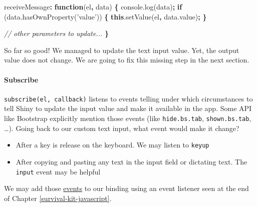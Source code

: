 \documentclass[]{book}
\newenvironment{Shaded}{\begin{snugshade}}{\end{snugshade}}
\newcommand{\AttributeTok}[1]{\textcolor[rgb]{0.77,0.63,0.00}{#1}}
\newcommand{\CommentTok}[1]{\textcolor[rgb]{0.56,0.35,0.01}{\textit{#1}}}
\newcommand{\ControlFlowTok}[1]{\textcolor[rgb]{0.13,0.29,0.53}{\textbf{#1}}}
\newcommand{\KeywordTok}[1]{\textcolor[rgb]{0.13,0.29,0.53}{\textbf{#1}}}
\newcommand{\NormalTok}[1]{#1}
\newcommand{\OperatorTok}[1]{\textcolor[rgb]{0.81,0.36,0.00}{\textbf{#1}}}
\newcommand{\StringTok}[1]{\textcolor[rgb]{0.31,0.60,0.02}{#1}}
\newcommand{\VariableTok}[1]{\textcolor[rgb]{0.00,0.00,0.00}{#1}}
\providecommand{\tightlist}{%
  \setlength{\itemsep}{0pt}\setlength{\parskip}{0pt}}
\let\oldparagraph\paragraph
\renewcommand{\paragraph}[1]{\oldparagraph{#1}\mbox{}}
\begin{document}
\begin{Shaded}
\begin{Highlighting}[]
\NormalTok{receiveMessage}\OperatorTok{:} \KeywordTok{function}\NormalTok{(el}\OperatorTok{,}\NormalTok{ data) }\OperatorTok{\{}
\VariableTok{console}\NormalTok{.}\AttributeTok{log}\NormalTok{(data)}\OperatorTok{;}
\ControlFlowTok{if}\NormalTok{ (}\VariableTok{data}\NormalTok{.}\AttributeTok{hasOwnProperty}\NormalTok{(}\StringTok{'value'}\NormalTok{)) }\OperatorTok{\{}
\KeywordTok{this}\NormalTok{.}\AttributeTok{setValue}\NormalTok{(el}\OperatorTok{,} \VariableTok{data}\NormalTok{.}\AttributeTok{value}\NormalTok{)}\OperatorTok{;}
\OperatorTok{\}}

\CommentTok{// other parameters to update...}
\OperatorTok{\}}
\end{Highlighting}
\end{Shaded}

So far so good! We managed to update the text input value. Yet, the output value does not change. We are going to fix this missing step in the next section.

\hypertarget{subscribe}{%
\paragraph{Subscribe}\label{subscribe}}

\texttt{subscribe(el,\ callback)} listens to events telling under which circumstances to tell Shiny to update the input value and make it available in the app. Some API like Bootstrap explicitly mention those events (like \texttt{hide.bs.tab}, \texttt{shown.bs.tab}, \ldots{}).
Going back to our custom text input, what event would make it change?

\begin{itemize}
\tightlist
\item
  After a key is release on the keyboard. We may listen to \texttt{keyup}
\item
  After copying and pasting any text in the input field or dictating text. The \texttt{input} event may be helpful
\end{itemize}

We may add those \href{https://javascript.info/events-change-input}{events} to our binding using an event listener seen at the end of Chapter \ref{survival-kit-javascript}.

\begin{Shaded}
\end{Shaded}
\end{document}

